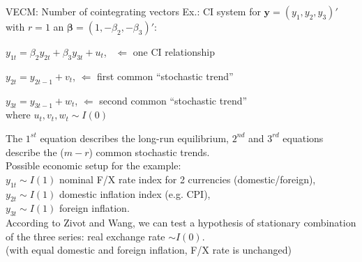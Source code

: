 \documentclass[usenames,dvipsnames]{beamer}
\begin{document}
\begin{frame}{VECM: Number of cointegrating vectors}
\footnotesize
Ex.: CI system for $\bm{y} = (y_1, y_2, y_3)'$ with $r=1$ an $\bm{\beta} = (1, -\beta_2, -\beta_3)'$:
\begin{enumerate}[ {[}1{]} ]
\item $y_{1t} = \beta_2 y_{2t} + \beta_3 y_{3t} + u_t$, \  $\Leftarrow$ one CI relationship
\item $y_{2t} = y_{2t-1} + v_t$, \hspace*{1.20cm} $\Leftarrow$ first common ``stochastic trend''
\item $y_{3t} = y_{3t-1} + w_t$, \hspace*{1.12cm} $\Leftarrow$ second common ``stochastic trend''\\
where $u_t, v_t, w_t \sim I(0)$
\end{enumerate}
The $1^{st}$ equation describes the long-run equilibrium, $2^{nd}$ and $3^{rd}$ equations describe the ($m-r$) common stochastic trends.\\
\medskip
Possible economic setup for the example:\\
\medskip
$y_{1t} \sim I(1)$ nominal F/X rate index for 2 currencies (domestic/foreign), \\ 
$y_{2t} \sim I(1)$ domestic inflation index (e.g. CPI), \\
$y_{3t} \sim I(1)$ foreign inflation. \\
\medskip
According to Zivot and Wang, we can test a hypothesis of stationary combination of the three series:  real exchange rate $\sim I(0)$.\\(with equal domestic and foreign inflation, F/X rate is unchanged)
\end{frame}
\end{document}
